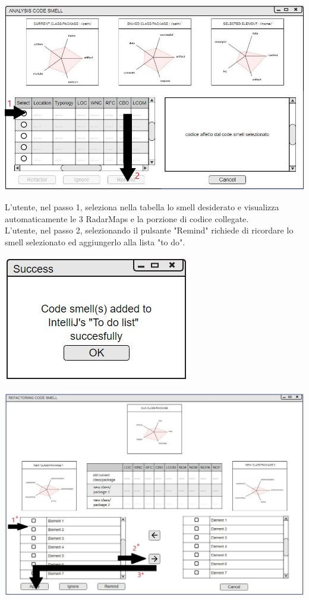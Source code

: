 \documentclass[11pt]{article}
\begin{document}
			\includegraphics[width=\columnwidth]{mock-up_analisi3.jpg}
			
			\flushleft
			L'utente, nel passo 1, seleziona nella tabella lo smell desiderato e visualizza automaticamente le 3 RadarMaps e la porzione di codice collegate.\\ \vspace{0.2cm}
			L'utente, nel passo 2, selezionando il pulsante "Remind" richiede di ricordare lo smell selezionato ed aggiungerlo alla lista "to do".\vspace{0.5cm}
			
			\centering	
			\includegraphics[scale=0.9]{pop-up_remind.jpg}\\
			
			\includegraphics[width=\columnwidth]{mock-up_refactoring2_1.jpg}
			
\end{document}

